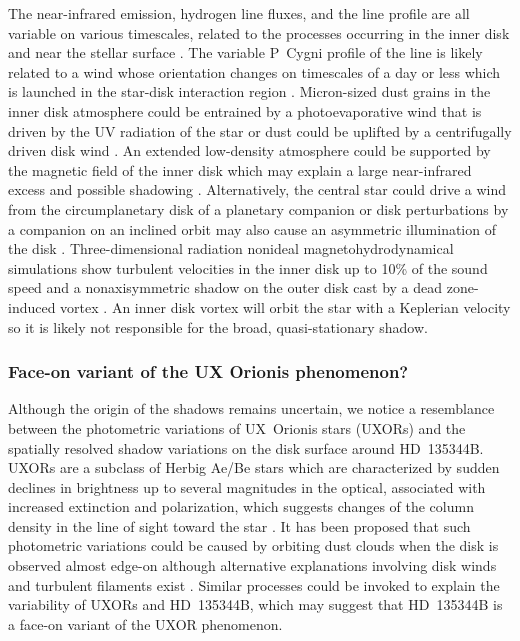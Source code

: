 \documentclass[twocolumn,tighten]{aastex61}
\begin{document}
The near-infrared emission, hydrogen line fluxes, and the  line profile are all variable on various timescales, related to the processes occurring in the inner disk and near the stellar surface \citep{grady2009,sitko2012}. The variable P~Cygni profile of the  line is likely related to a wind whose orientation changes on timescales of a day or less \citep{sitko2012} which is launched in the star-disk interaction region \citep[e.g.,][]{edwards2009}. Micron-sized dust grains in the inner disk atmosphere could be entrained by a photoevaporative wind that is driven by the UV radiation of the star \citep{owen2011,hutchison2016} or dust could be uplifted by a centrifugally driven disk wind \citep{bans2012}. An extended low-density atmosphere could be supported by the magnetic field of the inner disk which may explain a large near-infrared excess and possible shadowing \citep{turner2014}. Alternatively, the central star could drive a wind from the circumplanetary disk of a planetary companion \citep{tambovtseva2006} or disk perturbations by a companion on an inclined orbit may also cause an asymmetric illumination of the disk \citep{demidova2013}. Three-dimensional radiation nonideal magnetohydrodynamical simulations show turbulent velocities in the inner disk up to 10\% of the sound speed and a nonaxisymmetric shadow on the outer disk cast by a dead zone-induced vortex \citep{flock2017}. An inner disk vortex will orbit the star with a Keplerian velocity so it is likely not responsible for the broad, quasi-stationary shadow.

\subsubsection{Face-on variant of the UX Orionis phenomenon?}\label{sec:uxor}

Although the origin of the shadows remains uncertain, we notice a resemblance between the photometric variations of UX~Orionis stars (UXORs) and the spatially resolved shadow variations on the disk surface around HD~135344B. UXORs are a subclass of Herbig Ae/Be stars which are characterized by sudden declines in brightness up to several magnitudes in the optical, associated with increased extinction and polarization, which suggests changes of the column density in the line of sight toward the star \citep{waters1998}. It has been proposed that such photometric variations could be caused by orbiting dust clouds when the disk is observed almost edge-on \citep{grinin1994} although alternative explanations involving disk winds \citep{grinin2003} and turbulent filaments exist \citep{dullemond2003}. Similar processes could be invoked to explain the variability of UXORs and HD~135344B, which may suggest that HD~135344B is a face-on variant of the UXOR phenomenon.
\end{document}
